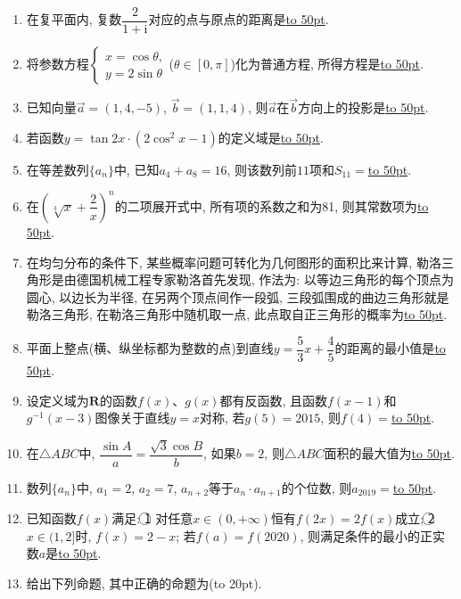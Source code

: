 \documentclass[10pt,a4paper]{article}
\newcommand{\blank}[1]{\underline{\hbox to #1pt{}}}
\newcommand{\bracket}[1]{(\hbox to #1pt{})}
\begin{document}
\begin{enumerate}[1.]
\item 在复平面内, 复数$\dfrac 2{1+\mathrm{i}}$对应的点与原点的距离是\blank{50}.
\item 将参数方程$\begin{cases} x=\cos \theta,  \\ y=2\sin \theta  \end{cases}$($\theta \in [0,\pi ]$)化为普通方程, 所得方程是\blank{50}.
\item 已知向量$\overrightarrow a=(1,4,-5)$, $\overrightarrow b=(1,1,4)$, 则$\overrightarrow a$在$\overrightarrow b$方向上的投影是\blank{50}.
\item 若函数$y=\tan 2x\cdot(2\cos^2x-1)$的定义域是\blank{50}.
\item 在等差数列$\{a_n\}$中, 已知$a_4+a_8=16$, 则该数列前$11$项和$S_{11}=$\blank{50}.
\item 在$(\sqrt[3]x+\dfrac 2x)^n$的二项展开式中, 所有项的系数之和为81, 则其常数项为\blank{50}.
\item 在均匀分布的条件下, 某些概率问题可转化为几何图形的面积比来计算, 勒洛三角形是由德国机械工程专家勒洛首先发现, 作法为: 以等边三角形的每个顶点为圆心, 以边长为半径, 在另两个顶点间作一段弧, 三段弧围成的曲边三角形就是勒洛三角形, 在勒洛三角形中随机取一点, 此点取自正三角形的概率为\blank{50}.
\begin{center}
\end{center}
\item 平面上整点(横、纵坐标都为整数的点)到直线$y=\dfrac 53x+\dfrac 45$的距离的最小值是\blank{50}.
\item 设定义域为$\mathbf{R}$的函数$f(x)$、$g(x)$都有反函数, 且函数$f(x-1)$和$g^{-1}(x-3)$图像关于直线$y=x$对称, 若$g(5)=2015$, 则$f(4)=$\blank{50}.
\item 在$\triangle ABC$中, $\dfrac{\sin A}a=\dfrac{\sqrt 3\cos B}b$, 如果$b=2$, 则$\triangle ABC$面积的最大值为\blank{50}.
\item 数列$\{a_n\}$中, $a_1=2$, $a_2=7$, $a_{n+2}$等于$a_n\cdot a_{n+1}$的个位数, 则$a_{2019}=$\blank{50}.
\item 已知函数$f(x)$满足: \textcircled{1} 对任意$x\in (0,+\infty)$恒有$f(2x)=2f(x)$成立; \textcircled{2} $x\in (1,2]$时, $f(x)=2-x$; 若$f(a)=f(2020)$, 则满足条件的最小的正实数$a$是\blank{50}.
\item 给出下列命题, 其中正确的命题为\bracket{20}.

\end{enumerate}
\end{document}
